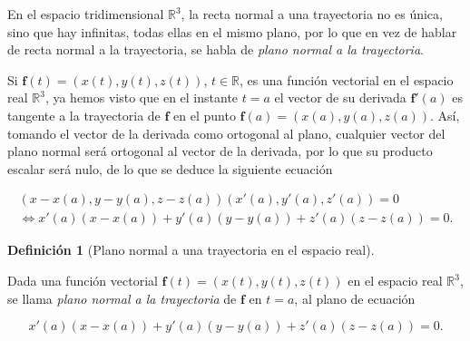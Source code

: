 \documentclass[
  a4paper,
]{scrreport}
\theoremstyle{definition}
\theoremstyle{plain}
\theoremstyle{definition}
\newtheorem{definition}{Definición}[chapter]
\theoremstyle{definition}
\theoremstyle{plain}
\theoremstyle{plain}
\theoremstyle{remark}
\begin{document}
En el espacio tridimensional \(\mathbb{R}^3\), la recta normal a una
trayectoria no es única, sino que hay infinitas, todas ellas en el mismo
plano, por lo que en vez de hablar de recta normal a la trayectoria, se
habla de \emph{plano normal a la trayectoria}.

Si \(\mathbf{f}(t)=(x(t),y(t),z(t))\), \(t\in \mathbb{R}\), es una
función vectorial en el espacio real \(\mathbb{R}^3\), ya hemos visto
que en el instante \(t=a\) el vector de su derivada \(\mathbf{f}'(a)\)
es tangente a la trayectoria de \(\mathbf{f}\) en el punto
\(\mathbf{f}(a)=(x(a),y(a),z(a))\). Así, tomando el vector de la
derivada como ortogonal al plano, cualquier vector del plano normal será
ortogonal al vector de la derivada, por lo que su producto escalar será
nulo, de lo que se deduce la siguiente ecuación

\[
\begin{gathered}
(x-x(a),y-y(a),z-z(a))(x'(a),y'(a),z'(a)) = 0 \\
\Leftrightarrow x'(a)(x-x(a))+y'(a)(y-y(a))+z'(a)(z-z(a))=0.
\end{gathered}
\]

\begin{definition}[Plano normal a una trayectoria en el espacio
real]\protect\hypertarget{def-plano-normal-trayectoria-espacio}{}\label{def-plano-normal-trayectoria-espacio}

Dada una función vectorial \(\mathbf{f}(t)=(x(t),y(t),z(t))\) en el
espacio real \(\mathbb{R}^3\), se llama \emph{plano normal a la
trayectoria} de \(\mathbf{f}\) en \(t=a\), al plano de ecuación

\[
x'(a)(x-x(a))+y'(a)(y-y(a))+z'(a)(z-z(a))=0.
\]

\end{definition}
\end{document}

